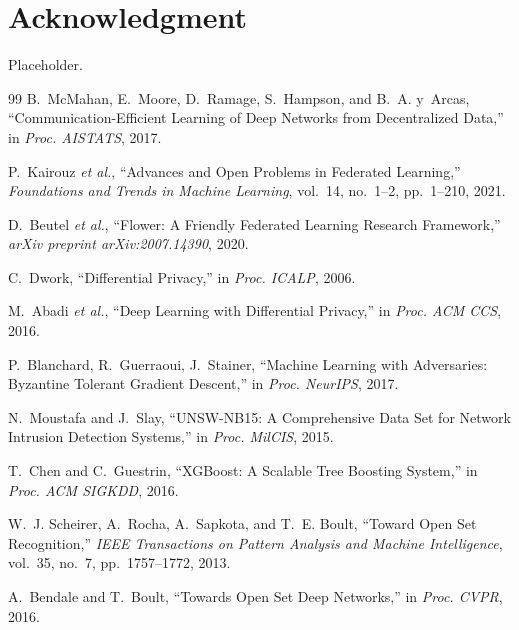 \documentclass[conference]{IEEEtran}
\begin{document}
% 

% 

% 

\section*{Acknowledgment}
Placeholder.

\begin{thebibliography}{99}
B.~McMahan, E.~Moore, D.~Ramage, S.~Hampson, and B.~A. y~Arcas, ``Communication-Efficient Learning of Deep Networks from Decentralized Data,'' in \emph{Proc. AISTATS}, 2017.

P.~Kairouz \emph{et al.}, ``Advances and Open Problems in Federated Learning,'' \emph{Foundations and Trends in Machine Learning}, vol.~14, no.~1--2, pp.~1--210, 2021.

D.~Beutel \emph{et al.}, ``Flower: A Friendly Federated Learning Research Framework,'' \emph{arXiv preprint arXiv:2007.14390}, 2020.

C.~Dwork, ``Differential Privacy,'' in \emph{Proc. ICALP}, 2006.

M.~Abadi \emph{et al.}, ``Deep Learning with Differential Privacy,'' in \emph{Proc. ACM CCS}, 2016.

P.~Blanchard, R.~Guerraoui, J.~Stainer, ``Machine Learning with Adversaries: Byzantine Tolerant Gradient Descent,'' in \emph{Proc. NeurIPS}, 2017.

N.~Moustafa and J.~Slay, ``UNSW-NB15: A Comprehensive Data Set for Network Intrusion Detection Systems,'' in \emph{Proc. MilCIS}, 2015.

T.~Chen and C.~Guestrin, ``XGBoost: A Scalable Tree Boosting System,'' in \emph{Proc. ACM SIGKDD}, 2016.

W.~J. Scheirer, A.~Rocha, A.~Sapkota, and T.~E. Boult, ``Toward Open Set Recognition,'' \emph{IEEE Transactions on Pattern Analysis and Machine Intelligence}, vol.~35, no.~7, pp.~1757--1772, 2013.

A.~Bendale and T.~Boult, ``Towards Open Set Deep Networks,'' in \emph{Proc. CVPR}, 2016.


\end{thebibliography}
\end{document}
